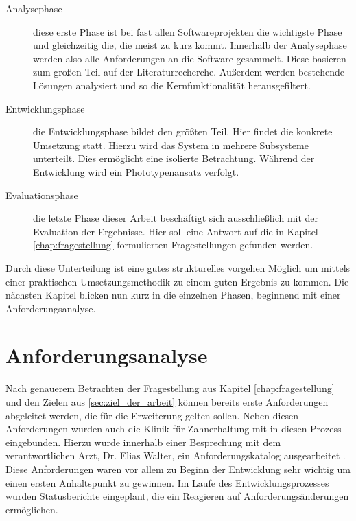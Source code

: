 \begin{description}
	\item[Analysephase] diese erste Phase ist bei fast allen Softwareprojekten die
		wichtigste Phase und gleichzeitig die, die meist zu kurz kommt. Innerhalb der
		Analysephase werden also alle Anforderungen an die Software gesammelt. Diese
		basieren zum großen Teil auf der Literaturrecherche. Außerdem werden bestehende
		Lösungen analysiert und so die Kernfunktionalität herausgefiltert.

	\item[Entwicklungsphase] die Entwicklungsphase bildet den größten Teil. Hier
		findet die konkrete Umsetzung statt. Hierzu wird das System in mehrere Subsysteme
		unterteilt. Dies ermöglicht eine isolierte Betrachtung. Während der Entwicklung
		wird ein Phototypenansatz verfolgt.

	\item[Evaluationsphase] die letzte Phase dieser Arbeit beschäftigt sich ausschließlich
		mit der Evaluation der Ergebnisse. Hier soll eine Antwort auf die in Kapitel
		\ref{chap:fragestellung} formulierten Fragestellungen gefunden werden.
\end{description}

Durch diese Unterteilung ist eine gutes strukturelles vorgehen Möglich um mittels
einer praktischen Umsetzungsmethodik zu einem guten Ergebnis zu kommen. Die
nächsten Kapitel blicken nun kurz in die einzelnen Phasen, beginnend mit einer Anforderungsanalyse.

\section{Anforderungsanalyse}
\label{sec:anforderungsanalyse} Nach genauerem Betrachten der Fragestellung aus Kapitel
\ref{chap:fragestellung} und den Zielen aus \ref{sec:ziel_der_arbeit} können bereits
erste Anforderungen abgeleitet werden, die für die Erweiterung gelten sollen. Neben
diesen Anforderungen wurden auch die Klinik für Zahnerhaltung mit in diesen Prozess
eingebunden. Hierzu wurde innerhalb einer Besprechung mit dem verantwortlichen
Arzt, Dr. Elias Walter, ein Anforderungskatalog ausgearbeitet \citep[vgl.][]{walter2025}.
Diese Anforderungen waren vor allem zu Beginn der Entwicklung sehr wichtig um einen
ersten Anhaltspunkt zu gewinnen. Im Laufe des Entwicklungsprozesses wurden
Statusberichte eingeplant, die ein Reagieren auf Anforderungsänderungen ermöglichen.


